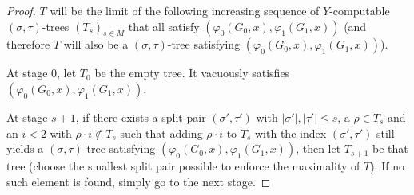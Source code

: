 \documentclass{article}
\numberwithin{theorem}{section}
\newtheorem{lemma}[theorem]{Lemma}
\begin{document}

\begin{proof}
$T$ will be the limit of the following increasing sequence of $Y$-computable $(\sigma, \tau)$-trees $(T_s)_{s \in M}$ that all satisfy $(\varphi_0(G_0, x), \varphi_1(G_1,x))$ (and therefore $T$ will also be a $(\sigma, \tau)$-tree satisfying $(\varphi_0(G_0, x), \varphi_1(G_1,x))$). 

At stage $0$, let $T_0$ be the empty tree. It vacuously satisfies $(\varphi_0(G_0, x), \varphi_1(G_1,x))$.

At stage $s+1$, if there exists a split pair $(\sigma', \tau')$ with $|\sigma'|,|\tau'| \leq s$, a $\rho \in T_s$ and an $i < 2$ with $\rho \cdot i \notin T_s$ such that adding $\rho \cdot i$ to $T_s$ with the index $(\sigma', \tau')$ still yields a $(\sigma, \tau)$-tree satisfying $(\varphi_0(G_0, x), \varphi_1(G_1,x))$, then let $T_{s+1}$ be that tree (choose the smallest split pair possible to enforce the maximality of $T$). If no such element is found, simply go to the next stage.
\end{proof}
\end{document}
